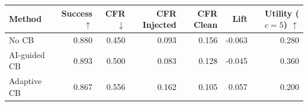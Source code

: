 \begin{tabular}{lrrrrrr}
\toprule
Method & Success $\uparrow$ & CFR $\downarrow$ & CFR Injected & CFR Clean & Lift & Utility ($c=5$) $\uparrow$ \\
\midrule
No CB & 0.880 & 0.450 & 0.093 & 0.156 & -0.063 & 0.280 \\
AI-guided CB & 0.893 & 0.500 & 0.083 & 0.128 & -0.045 & 0.360 \\
Adaptive CB & 0.867 & 0.556 & 0.162 & 0.105 & 0.057 & 0.200 \\
\bottomrule
\end{tabular}
